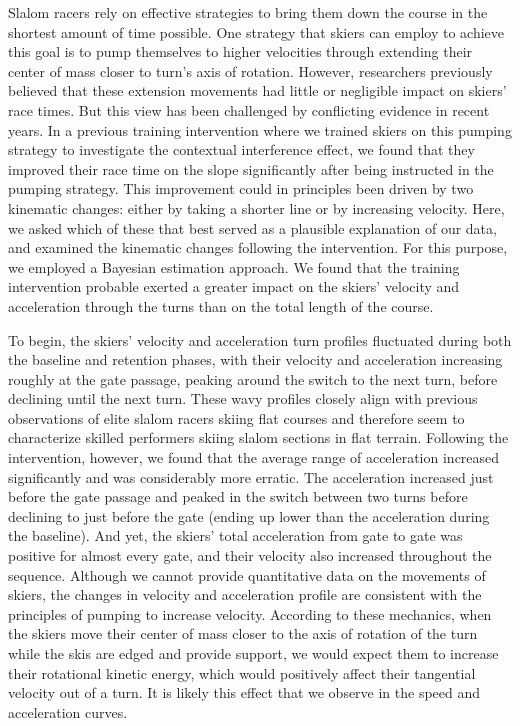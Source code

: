 \documentclass{article}
\begin{document}
Slalom racers rely on effective strategies to bring them down the course in the shortest amount of time possible. One strategy that skiers can employ to achieve this goal is to pump themselves to higher velocities through extending their center of mass closer to turn's axis of rotation. However, researchers previously believed that these extension movements had little or negligible impact on skiers' race times. But this view has been challenged by conflicting evidence in recent years. In a previous training intervention where we trained skiers on this pumping strategy to investigate the contextual interference effect, we found that they improved their race time on the slope significantly after being instructed in the pumping strategy. This improvement could in principles been driven by two kinematic changes: either by taking a shorter line or by increasing velocity. Here, we asked which of these that best served as a plausible explanation of our data, and examined the kinematic changes following the intervention. For this purpose, we employed a Bayesian estimation approach. We found that the training intervention probable exerted a greater impact on the skiers' velocity and acceleration through the turns than on the total length of the course. 

To begin, the skiers' velocity and acceleration turn profiles fluctuated during both the baseline and retention phases, with their velocity and acceleration increasing roughly at the gate passage, peaking around the switch to the next turn, before declining until the next turn. These wavy profiles closely align with previous observations of elite slalom racers skiing flat courses \cite{supej_impact_2015} and therefore seem to characterize skilled performers skiing slalom sections in flat terrain. Following the intervention, however, we found that the average range of acceleration increased significantly and was considerably more erratic. The acceleration increased just before the gate passage and peaked in the switch between two turns before declining to just before the gate (ending up lower than the acceleration during the baseline). And yet, the skiers' total acceleration from gate to gate was positive for almost every gate, and their velocity also increased throughout the sequence. Although we cannot provide quantitative data on the movements of skiers, the changes in velocity and acceleration profile are consistent with the principles of pumping to increase velocity. According to these mechanics, when the skiers move their center of mass closer to the axis of rotation of the turn while the skis are edged and provide support, we would expect them to increase their rotational kinetic energy, which would positively affect their tangential velocity out of a turn. It is likely this effect that we observe in the speed and acceleration curves.
\end{document}
